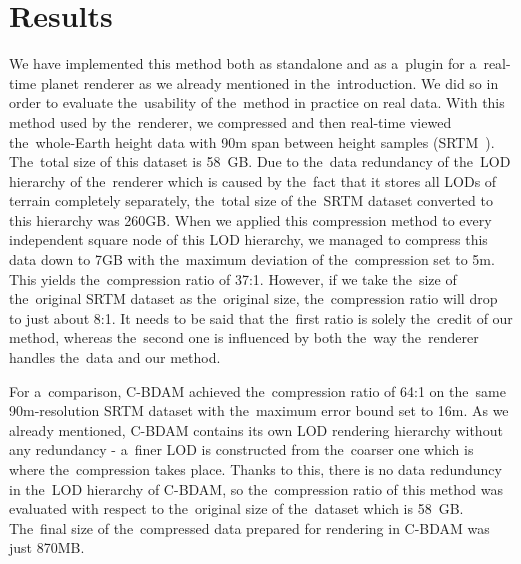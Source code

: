 \chapter{Results}\label{chap:results}

We have implemented this method both as standalone and as a~plugin for a~real-time planet renderer as we already mentioned in the~introduction. We did so in order to evaluate the~usability of the~method in practice on real data. With this method used by the~renderer, we compressed and then real-time viewed the~whole-Earth height data with 90m span between height samples (SRTM~\cite{srtm}). The~total size of this dataset is 58~GB. Due to the~data redundancy of the~LOD hierarchy of the~renderer which is caused by the~fact that it stores all LODs of terrain completely separately, the~total size of the~SRTM dataset converted to this hierarchy was 260GB. When we applied this compression method to every independent square node of this LOD hierarchy, we managed to compress this data down to 7GB with the~maximum deviation of the~compression set to 5m. This yields the~compression ratio of 37:1. However, if we take the~size of the~original SRTM dataset as the~original size, the~compression ratio will drop to just about 8:1. It needs to be said that the~first ratio is solely the~credit of our method, whereas the~second one is influenced by both the~way the~renderer handles the~data and our method. 

For a~comparison, C-BDAM achieved the~compression ratio of 64:1 on the~same 90m-resolution SRTM dataset with the~maximum error bound set to 16m. As we already mentioned, C-BDAM contains its own LOD rendering hierarchy without any redundancy - a~finer LOD is constructed from the~coarser one which is where the~compression takes place. Thanks to this, there is no data redunduncy in the~LOD hierarchy of C-BDAM, so the~compression ratio of this method was evaluated with respect to the~original size of the~dataset which is 58~GB. The~final size of the~compressed data prepared for rendering in C-BDAM was just 870MB.

